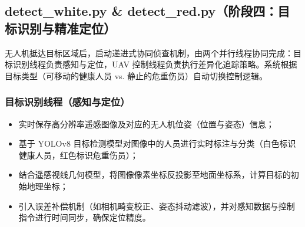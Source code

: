 \documentclass[12pt]{article}
\begin{document}
\subsection{detect\_white.py \& detect\_red.py（阶段四：目标识别与精准定位）}

无人机抵达目标区域后，启动递进式协同侦查机制，由两个并行线程协同完成：目标识别线程负责感知与定位，UAV 控制线程负责执行差异化追踪策略。系统根据目标类型（可移动的健康人员 vs. 静止的危重伤员）自动切换控制逻辑。


\subsubsection{目标识别线程（感知与定位）}
\begin{itemize}
    \item 实时保存高分辨率遥感图像及对应的无人机位姿（位置与姿态）信息；
    \item 基于 YOLOv8 目标检测模型对图像中的人员进行实时标注与分类（白色标识健康人员，红色标识危重伤员）；
    \item 结合遥感视线几何模型，将图像像素坐标反投影至地面坐标系，计算目标的初始地理坐标；
    \item 引入误差补偿机制（如相机畸变校正、姿态抖动滤波），并对感知数据与控制指令进行时间同步，确保定位精度。
\end{itemize}
\end{document}
